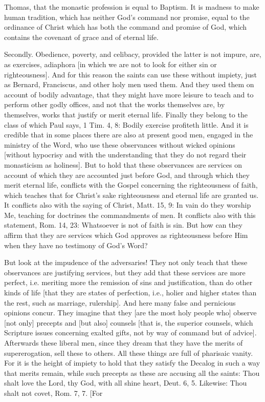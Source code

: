Thomas, that the monastic profession is equal to Baptism.  It is
madness to make human tradition, which has neither God's command nor
promise, equal to the ordinance of Christ which has both the command
and promise of God, which contains the covenant of grace and of
eternal life.

Secondly.  Obedience, poverty, and celibacy, provided the latter is
not impure, are, as exercises, adiaphora [in which we are not to look
for either sin or righteousness].  And for this reason the saints can
use these without impiety, just as Bernard, Franciscus, and other
holy men used them.  And they used them on account of bodily
advantage, that they might have more leisure to teach and to perform
other godly offices, and not that the works themselves are, by
themselves, works that justify or merit eternal life.  Finally they
belong to the class of which Paul says, 1 Tim. 4, 8: Bodily exercise
profiteth little.  And it is credible that in some places there are
also at present good men, engaged in the ministry of the Word, who
use these observances without wicked opinions [without hypocrisy and
with the understanding that they do not regard their monasticism as
holiness].  But to hold that these observances are services on
account of which they are accounted just before God, and through
which they merit eternal life, conflicts with the Gospel concerning
the righteousness of faith, which teaches that for Christ's sake
righteousness and eternal life are granted us.  It conflicts also
with the saying of Christ, Matt. 15, 9: In vain do they worship Me,
teaching for doctrines the commandments of men.  It conflicts also
with this statement, Rom. 14, 23: Whatsoever is not of faith is sin.
But how can they affirm that they are services which God approves as
righteousness before Him when they have no testimony of God's Word?

But look at the impudence of the adversaries!  They not only teach
that these observances are justifying services, but they add that
these services are more perfect, i.e. meriting more the remission of
sins and justification, than do other kinds of life [that they are
states of perfection, i.e., holier and higher states than the rest,
such as marriage, rulership].  And here many false and pernicious
opinions concur.  They imagine that they [are the most holy people
who] observe [not only] precepts and [but also] counsels [that is,
the superior counsels, which Scripture issues concerning exalted
gifts, not by way of command but of advice].  Afterwards these
liberal men, since they dream that they have the merits of
supererogation, sell these to others.  All these things are full of
pharisaic vanity.  For it is the height of impiety to hold that they
satisfy the Decalog in such a way that merits remain, while such
precepts as these are accusing all the saints: Thou shalt love the
Lord, thy God, with all shine heart, Deut. 6, 5. Likewise: Thou shalt
not covet, Rom. 7, 7. [For

